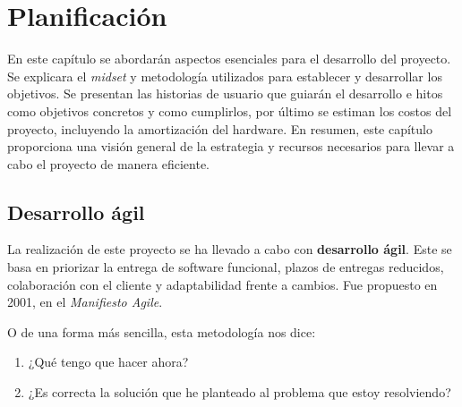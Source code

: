 \chapter{Planificación}
En este capítulo se abordarán aspectos esenciales para el desarrollo del proyecto. Se explicara el \textit{midset} y metodología utilizados para establecer y desarrollar los objetivos. Se presentan las historias de usuario que guiarán el desarrollo e hitos como objetivos concretos y como cumplirlos, por último se estiman los costos del proyecto, incluyendo la amortización del hardware. En resumen, este capítulo proporciona una visión general de la estrategia y recursos necesarios para llevar a cabo el proyecto de manera eficiente.

\section{Desarrollo ágil}
La realización de este proyecto se ha llevado a cabo con \textbf{desarrollo ágil}. Este se basa en priorizar la entrega de software funcional, plazos de entregas reducidos, colaboración con el cliente y adaptabilidad frente a cambios. Fue propuesto en 2001, en el \textit{Manifiesto Agile}.\cite{agile}

O de una forma más sencilla, esta metodología nos dice:
\begin{enumerate}
    \item ¿Qué tengo que hacer ahora?
    \item ¿Es correcta la solución que he planteado al problema que estoy resolviendo?
\end{enumerate}

